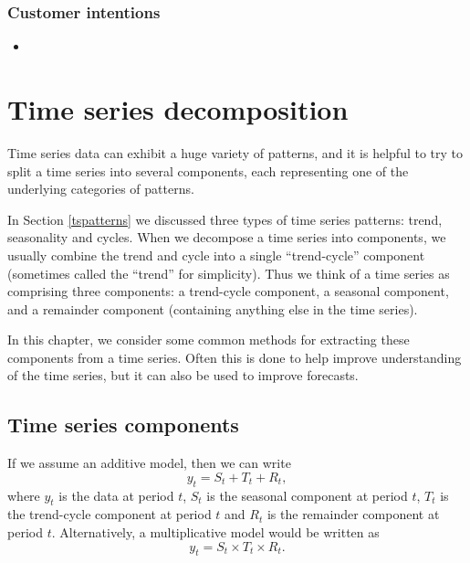 \documentclass[]{book}
\providecommand{\tightlist}{%
  \setlength{\itemsep}{0pt}\setlength{\parskip}{0pt}}
\begin{document}
\hypertarget{customer-intentions-1}{%
\subsection*{Customer intentions}\label{customer-intentions-1}}

\begin{itemize}
\tightlist
\item
  \citet{Morwitz2007}
\end{itemize}

\hypertarget{ch-decomposition}{%
\chapter{Time series decomposition}\label{ch-decomposition}}

Time series data can exhibit a huge variety of patterns, and it is helpful to try to split a time series into several components, each representing one of the underlying categories of patterns.

In Section \ref{tspatterns} we discussed three types of time series patterns: trend, seasonality and cycles. When we decompose a time series into components, we usually combine the trend and cycle into a single ``trend-cycle'' component (sometimes called the ``trend'' for simplicity). Thus we think of a time series as comprising three components: a trend-cycle component, a seasonal component, and a remainder component (containing anything else in the time series).

In this chapter, we consider some common methods for extracting these components from a time series. Often this is done to help improve understanding of the time series, but it can also be used to improve forecasts.

\hypertarget{sec-6-1-TSpatterns}{%
\section{Time series components}\label{sec-6-1-TSpatterns}}

If we assume an additive model, then we can write
\[
  y_{t} = S_{t} + T_{t} + R_t,
\]
where \(y_{t}\) is the data at period \(t\), \(S_{t}\) is the seasonal component at period \(t\), \(T_{t}\) is the trend-cycle component at period \(t\) and \(R_t\) is the remainder component at period \(t\). Alternatively, a multiplicative model would be written as
\[
  y_{t} = S_{t} \times T_{t} \times R_t.
\]
\end{document}
